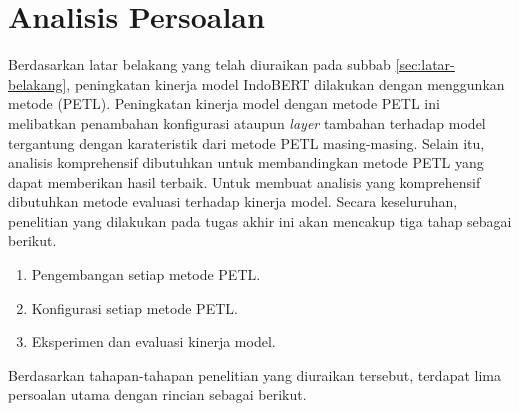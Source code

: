 \section{Analisis Persoalan}
\label{sec:analisis-persoalan}

Berdasarkan latar belakang yang telah diuraikan pada subbab \ref{sec:latar-belakang}, peningkatan kinerja model IndoBERT dilakukan dengan menggunkan metode \PETL (PETL). Peningkatan kinerja model dengan metode PETL ini melibatkan penambahan konfigurasi ataupun \textit{layer} tambahan terhadap model tergantung dengan karateristik dari metode PETL masing-masing. Selain itu, analisis komprehensif dibutuhkan untuk membandingkan metode PETL yang dapat memberikan hasil terbaik. Untuk membuat analisis yang komprehensif dibutuhkan metode evaluasi terhadap kinerja model. Secara keseluruhan, penelitian yang dilakukan pada tugas akhir ini akan mencakup tiga tahap sebagai berikut.

\begin{enumerate}
    \item Pengembangan setiap metode PETL.
    \item Konfigurasi setiap metode PETL.
    \item Eksperimen dan evaluasi kinerja model.
\end{enumerate}

Berdasarkan tahapan-tahapan penelitian yang diuraikan tersebut, terdapat lima persoalan utama dengan rincian sebagai berikut.

